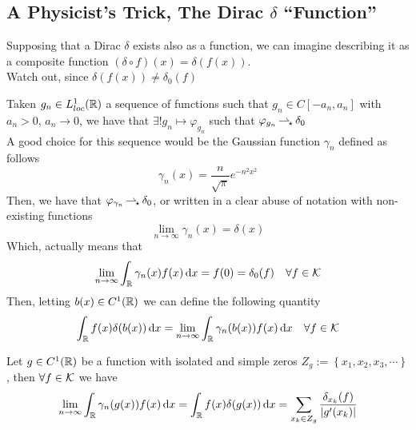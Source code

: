 \documentclass[../complete.tex]{subfiles}
\begin{document}
\subsection{A Physicist's Trick, The Dirac $\delta$ ``Function''}
\begin{dfn}
	Supposing that a Dirac $\delta$ exists also as a function, we can imagine describing it as a composite function $(\delta\circ f)(x)=\delta(f(x))$.\\
	Watch out, since $\delta(f(x))\ne\delta_0(f)$
\end{dfn}
\begin{dfn}
	Taken $g_n\in L^1_{loc}(\mathbb{R})$ a sequence of functions such that $g_n\in C[-a_n,a_n]$ with $a_n>0$, $a_n\to0$, we have that $\exists!g_n\mapsto\varphi_{g_n}$ such that $\varphi_{g_n}\operatorname{\rightharpoonup_{\!\star}}\delta_0$\\
	A good choice for this sequence would be the Gaussian function $\gamma_n$ defined as follows
	\begin{equation}
		\gamma_n(x)=\frac{n}{\sqrt{\pi}}e^{-n^2x^2}
		\label{eq:gaussianfunc}
	\end{equation}
	Then, we have that $\varphi_{\gamma_n}\operatorname{\rightharpoonup_{\!\star}}\delta_0$, or written in a clear abuse of notation with non-existing functions
	\begin{equation*}
		\lim_{n\to\infty}\gamma_n(x)=\delta(x)
	\end{equation*}
	Which, actually means that
	\begin{equation*}
		\lim_{n\to\infty}\int_{\mathbb{R}}^{}\gamma_n(x)f(x)\operatorname{d\!} x=f(0)=\delta_0(f)\quad\forall f\in\mathcal{K}
	\end{equation*}
	Then, letting $b(x)\in C^1(\mathbb{R})$ we can define the following quantity
	\begin{equation*}
		\int_{\mathbb{R}}^{}f(x)\delta(b(x))\operatorname{d\!} x=\lim_{n\to\infty}\int_{\mathbb{R}}^{}\gamma_n(b(x))f(x)\operatorname{d\!} x\quad\forall f\in\mathcal{K}
	\end{equation*}
\end{dfn}
\begin{thm}
	Let $g\in C^1(\mathbb{R})$ be a function with isolated and simple zeros $Z_g:=\left\{ x_1,x_2,x_3,\cdots \right\}$, then $\forall f\in\mathcal{K}$ we have
	\begin{equation}
		\lim_{n\to\infty}\int_{\mathbb{R}}^{}\gamma_n(g(x))f(x)\operatorname{d\!} x=\int_{\mathbb{R}}^{}f(x)\delta(g(x))\operatorname{d\!} x=\sum_{x_k\in Z_g}\frac{\delta_{x_k}(f)}{\abs{g'(x_k)}}
		\label{eq:compdelta}
	\end{equation}
\end{thm}
\end{document}
